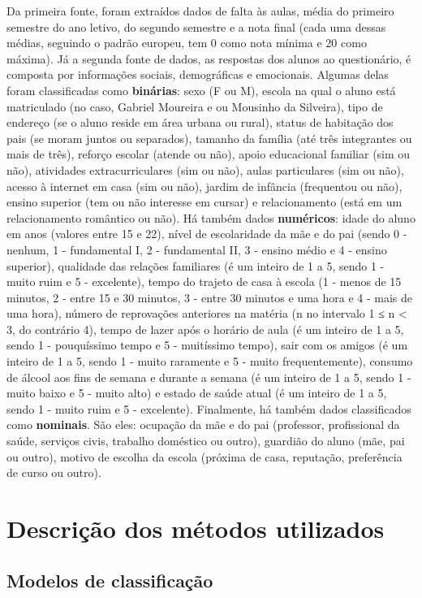\documentclass[]{IEEEphot}
\begin{document}
Da primeira fonte, foram extraídos dados de falta às aulas, média do primeiro semestre do ano letivo, do segundo semestre e a nota final (cada uma dessas médias, seguindo o padrão europeu, tem 0 como nota mínima e 20 como máxima). Já a segunda fonte de dados, as respostas dos alunos ao questionário, é composta por informações sociais, demográficas e emocionais. Algumas delas foram classificadas como \textbf{binárias}: sexo (F ou M), escola na qual o aluno está matriculado (no caso, Gabriel Moureira e ou Mousinho da Silveira), tipo de endereço (se o aluno reside em área urbana ou rural), status de habitação dos pais (se moram juntos ou separados), tamanho da família (até três integrantes ou mais de três), reforço escolar (atende ou não), apoio educacional familiar (sim ou não), atividades extracurriculares (sim ou não), aulas particulares (sim ou não), acesso à internet em casa (sim ou não), jardim de infância (frequentou ou não), ensino superior (tem ou não interesse em cursar) e relacionamento (está em um relacionamento romântico ou não). Há também dados \textbf{numéricos}: idade do aluno em anos (valores entre 15 e 22), nível de escolaridade da mãe e do pai (sendo 0 - nenhum, 1 - fundamental I, 2 - fundamental II, 3 - ensino médio e 4 - ensino superior), qualidade das relações familiares (é um inteiro de 1 a 5, sendo 1 - muito ruim e 5 - excelente), tempo do trajeto de casa à escola (1 - menos de 15 minutos, 2 - entre 15 e 30 minutos, 3 - entre 30 minutos e uma hora e 4 - mais de uma hora), número de reprovações anteriores na matéria (n no intervalo 1 ≤ n < 3, do contrário 4), tempo de lazer após o horário de aula (é um inteiro de 1 a 5, sendo 1 - pouquíssimo tempo e 5 - muitíssimo tempo), sair com os amigos (é um inteiro de 1 a 5, sendo 1 - muito raramente e 5 - muito frequentemente), consumo de álcool aos fins de semana e durante a semana (é um inteiro de 1 a 5, sendo 1 - muito baixo e 5 - muito alto) e estado de saúde atual (é um inteiro de 1 a 5, sendo 1 - muito ruim e 5 - excelente). Finalmente, há também dados classificados como \textbf{nominais}. São eles: ocupação da mãe e do pai (professor, profissional da saúde, serviços civis, trabalho doméstico ou outro), guardião do aluno (mãe, pai ou outro), motivo de escolha da escola (próxima de casa, reputação, preferência de curso ou outro).

\section{Descrição dos métodos utilizados}
\subsection{Modelos de classificação}
\end{document}
